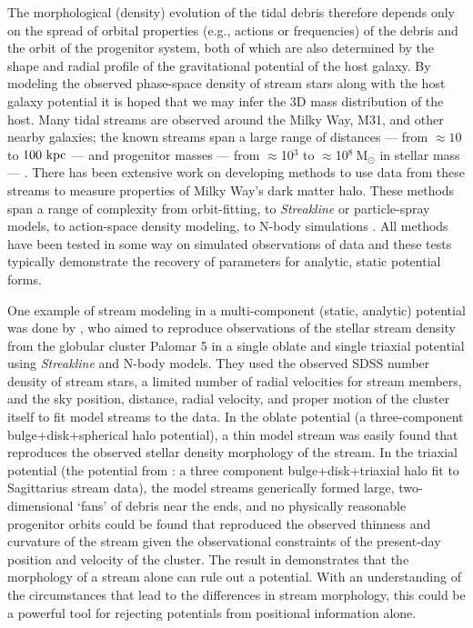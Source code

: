 \documentclass[letterpaper,12pt,preprint]{aastex}
\newcommand{\msun}{\ensuremath{\mathrm{M}_\odot}}
\begin{document}
The morphological (density) evolution of the tidal debris therefore depends only on the spread of orbital properties (e.g., actions or frequencies) of the debris and the orbit of the progenitor system, both of which are also determined by the shape and radial profile of the gravitational potential of the host galaxy. By modeling the observed phase-space density of stream stars along with the host galaxy potential it is hoped that we may infer the 3D mass distribution of the host. Many tidal streams are observed around the Milky Way, M31, and other nearby galaxies; the known streams span a large range of distances --- from $\approx10$ to $100~{\rm kpc}$ --- and progenitor masses --- from $\approx$10$^3$ to $\approx$10$^8~\msun$ in stellar mass --- \citep[][]{ibata94, belokurov06,grillmair06a,grillmair06b}. There has been extensive work on developing methods to use data from these streams to measure properties of Milky Way's dark matter halo. These methods span a range of complexity from orbit-fitting, to \emph{Streakline} or particle-spray models, to action-space density modeling, to N-body simulations \citep[see, e.g., the introduction of][]{kuepper15}. All methods have been tested in some way on simulated observations of data and these tests typically demonstrate the recovery of parameters for analytic, static potential forms. 

One example of stream modeling in a multi-component (static, analytic) potential was done by \citet{pearson15}, who aimed to reproduce observations of the stellar stream density from the globular cluster Palomar 5 in a single oblate and single triaxial potential using \emph{Streakline} \citep{kuepper12} and N-body models. They used the observed SDSS number density of stream stars, a limited number of radial velocities for stream members, and the sky position, distance, radial velocity, and proper motion of the cluster itself to fit model streams to the data. In the oblate potential (a three-component bulge+disk+spherical halo potential), a thin model stream was easily found that reproduces the observed stellar density morphology of the stream. In the triaxial potential (the potential from \cite{law10}: a three component bulge+disk+triaxial halo fit to Sagittarius stream data), the model streams generically formed large, two-dimensional `fans' of debris near the ends, and no physically reasonable progenitor orbits could be found that reproduced the observed thinness and curvature of the stream given the observational constraints of the present-day position and velocity of the cluster. The result in \citet{pearson15} demonstrates that the morphology of a stream alone can rule out a potential. With an understanding of the circumstances that lead to the differences in stream morphology, this could be a powerful tool for rejecting potentials from positional information alone.
\end{document}
